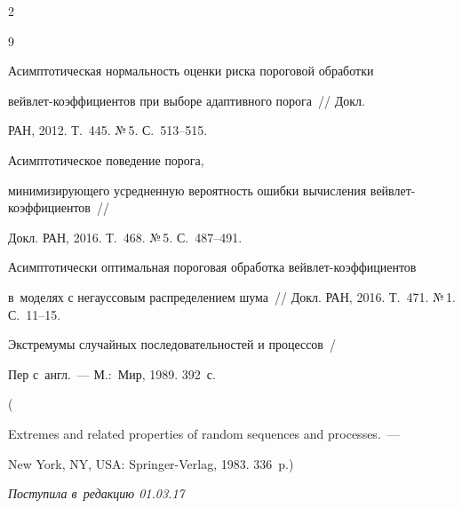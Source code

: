 \begin{multicols}{2}
{{\begin{thebibliography}{9}

 Асимптотическая нормальность оценки риска пороговой обработки 

вейв\-лет-ко\-эф\-фи\-ци\-ен\-тов при выборе адаптивного порога~// Докл. 

РАН, 2012. Т.~445. №\,5. С.~513--515.




 Асимптотическое поведение порога, 

минимизирующего усредненную вероятность ошибки вычисления вейв\-лет-ко\-эф\-фи\-ци\-ен\-тов~// 

Докл. РАН, 2016. Т.~468. №\,5. С.~487--491.





Асимптотически оптимальная пороговая обработка вейв\-лет-ко\-эф\-фи\-ци\-ен\-тов 

в~моделях с негауссовым распределением шума~// Докл. РАН, 2016. Т.~471. №\,1. С.~11--15.





Экстремумы случайных последовательностей и процессов~/

Пер с~англ.~--- М.:~Мир, 1989. 392~с.

( 

{Extremes and related properties of random sequences and processes.}~--- 

New York, NY, USA: Springer-Verlag, 1983. 336~p.)



 \end{thebibliography}



 }

 }



\end{multicols}



\vspace*{-3pt}



\hfill{\small\textit{Поступила в~редакцию 01.03.17}}



